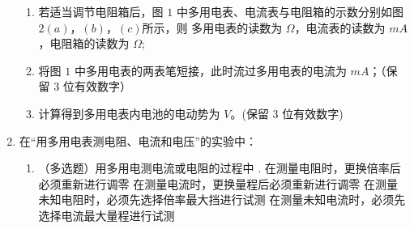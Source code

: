 \begin{enumerate}
\begin{enumerate}
\item 
若适当调节电阻箱后，图 $ 1 $ 中多用电表、电流表与电阻箱的示数分别如图 $ 2(a) $，$ (b) $，$ (c) $所示，则
多用电表的读数为 \underlinegap $ \Omega $，电流表的读数为 \underlinegap $ mA $，电阻箱的读数为 \underlinegap $ \Omega $;
\begin{figure}[h!]
\centering
\begin{subfigure}{0.4\linewidth}
\centering
 
\caption{}\label{}
\end{subfigure}
\begin{subfigure}{0.4\linewidth}
\centering
 
\caption{}\label{}
\end{subfigure}
\begin{subfigure}{0.4\linewidth}
\centering
 
\caption{}\label{}
\end{subfigure}

\end{figure}


\item 
将图 $ 1 $ 中多用电表的两表笔短接，此时流过多用电表的电流为 \underlinegap $ mA $；（保留 $ 3 $ 位有效数字）


\item 
计算得到多用电表内电池的电动势为 \underlinegap $ V $。(保留 $ 3 $ 位有效数字)


\end{enumerate}




\item 
{}
在“用多用电表测电阻、电流和电压”的实验中：
\begin{enumerate}
\item
（多选题）用多用电测电流或电阻的过程中 \underlinegap .
\fourchoices
{在测量电阻时，更换倍率后必须重新进行调零}
{在测量电流时，更换量程后必须重新进行调零}
{在测量未知电阻时，必须先选择倍率最大挡进行试测}
{在测量未知电流时，必须先选择电流最大量程进行试测}





\end{enumerate}
\end{enumerate}
